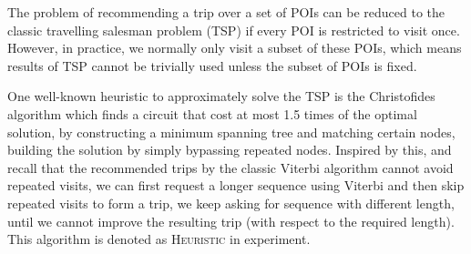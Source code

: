 

\noindent
The problem of recommending a trip over a set of POIs can be reduced to the classic travelling salesman problem (TSP)
if every POI is restricted to visit once.
However, in practice, we normally only visit a subset of these POIs,
which means results of TSP cannot be trivially used unless the subset of POIs is fixed.

\noindent
{} 

\noindent
One well-known heuristic to approximately solve the TSP is the Christofides algorithm which finds a circuit that cost at most 1.5 times
of the optimal solution, by constructing a minimum spanning tree and matching certain nodes, 
building the solution by simply bypassing repeated nodes.
Inspired by this, and recall that the recommended trips by the classic Viterbi algorithm cannot avoid repeated visits,
we can first request a longer sequence using Viterbi and then skip repeated visits to form a trip, 
we keep asking for sequence with different length, until we cannot improve the resulting trip (with respect to the required length).
This algorithm is denoted as \textsc{Heuristic} in experiment.

